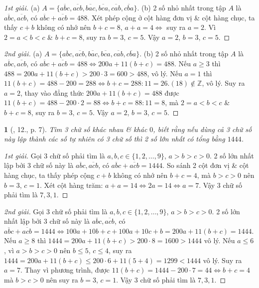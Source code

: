 \documentclass{article}
\newtheorem{baitoan}{}
\begin{document}
\begin{proof}[1st giải]
	(a) $A = \{\overline{abc},\overline{acb},\overline{bac},\overline{bca},\overline{cab},\overline{cba}\}$. (b) 2 số nhỏ nhất trong tập $A$ là $\overline{abc},\overline{acb}$, có $\overline{abc} + \overline{acb} = 488$. Xét phép cộng ở cột hàng đơn vị \& cột hàng chục, ta thấy $c + b$ không có nhớ nên $b + c = 8$, $a + a = 4\Leftrightarrow$ suy ra $a = 2$. Vì $2 = a < b < c$ \& $b + c = 8$, suy ra $b = 3$, $c = 5$. Vậy $a = 2$, $b = 3$, $c = 5$.
\end{proof}

\begin{proof}[2nd giải]
	(a) $A = \{\overline{abc},\overline{acb},\overline{bac},\overline{bca},\overline{cab},\overline{cba}\}$. (b) 2 số nhỏ nhất trong tập $A$ là $\overline{abc},\overline{acb}$, có $\overline{abc} + \overline{acb} = 488\Leftrightarrow200a + 11(b + c) = 488$. Nếu $a\ge3$ thì $488 = 200a + 11(b + c) > 200\cdot3 = 600 > 488$, vô lý. Nếu $a = 1$ thì $11(b + c) = 488 - 200 = 288\Leftrightarrow b + c = 288:11 = 26.(18)\notin\mathbb{Z}$, vô lý. Suy ra $a = 2$, thay vào đẳng thức $200a + 11(b + c) = 488$ được $11(b + c) = 488 - 200\cdot2 = 88\Leftrightarrow b + c = 88:11 = 8$, mà $2 = a < b < c$ \& $b + c = 8$, suy ra $b = 3$, $c = 5$. Vậy $a = 2$, $b = 3$, $c = 5$.
\end{proof}

\begin{baitoan}[\cite{Binh_Toan_6_tap_1}, 12., p. 7]
	Tìm 3 chữ số khác nhau \& khác $0$, biết rằng nếu dùng cả 3 chữ số này lập thành các số tự nhiên có 3 chữ số thì 2 số lớn nhất có tổng bằng $1444$.
\end{baitoan}

\begin{proof}[1st giải]
	Gọi 3 chữ số phải tìm là $a,b,c\in\{1,2,\ldots,9\}$, $a > b > c > 0$. 2 số lớn nhất lập bởi 3 chữ số này là $\overline{abc},\overline{acb}$, có $\overline{abc} + \overline{acb} = 1444$. So sánh 2 cột đơn vị \& cột hàng chục, ta thấy phép cộng $c + b$ không có nhớ nên $b + c = 4$, mà $b > c > 0$ nên $b = 3$, $c = 1$. Xét cột hàng trăm: $a + a  = 14\Leftrightarrow2a = 14\Leftrightarrow a = 7$. Vậy 3 chữ số phải tìm là $7,3,1$.
\end{proof}

\begin{proof}[2nd giải]
	Gọi 3 chữ số phải tìm là $a,b,c\in\{1,2,\ldots,9\}$, $a > b > c > 0$. 2 số lớn nhất lập bởi 3 chữ số này là $\overline{abc},\overline{acb}$, có $\overline{abc} + \overline{acb} = 1444\Leftrightarrow100a + 10b + c + 100a + 10c + b = 200a + 11(b + c) = 1444$. Nếu $a\ge8$ thì $1444 = 200a + 11(b + c) > 200\cdot8 = 1600 > 1444$ vô lý. Nếu $a\le6$, vì $a > b > c > 0$ nên $b\le5$, $c\le4$, suy ra $1444 = 200a + 11(b + c)\le200\cdot6 + 11(5 + 4) = 1299 < 1444$ vô lý. Suy ra $a = 7$. Thay vì phương trình, được $11(b + c) = 1444 - 200\cdot7 = 44\Leftrightarrow b + c = 4$ mà $b > c > 0$ nên suy ra $b = 3$, $c = 1$. Vậy 3 chữ số phải tìm là $7,3,1$.
\end{proof}
\end{document}
